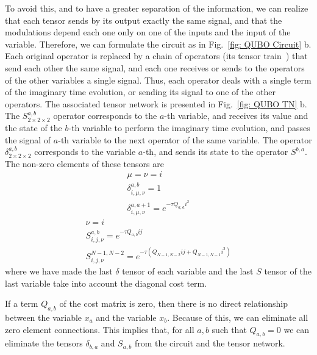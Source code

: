 To avoid this, and to have a greater separation of the information, we can realize that each tensor sends by its output exactly the same signal, and that the modulations depend each one only on one of the inputs and the input of the variable. Therefore, we can formulate the circuit as in Fig.~\ref{fig: QUBO Circuit} b. Each original operator is replaced by a chain of operators (its tensor train~\cite{Tensor_Train}) that send each other the same signal, and each one receives or sends to the operators of the other variables a single signal. Thus, each operator deals with a single term of the imaginary time evolution, or sending its signal to one of the other operators. The associated tensor network is presented in Fig.~\ref{fig: QUBO TN} b. The $S^{a,b}_{2\times 2\times 2}$ operator corresponds to the $a$-th variable, and receives its value and the state of the $b$-th variable to perform the imaginary time evolution, and passes the signal of $a$-th variable to the next operator of the same variable. The operator $\delta^{a,b}_{2\times 2\times 2}$ corresponds to the variable $a$-th, and sends its state to the operator $S^{b,a}$. The non-zero elements of these tensors are 
\begin{equation}\label{eq: QUBO delta}
    \begin{gathered}
        \mu = \nu = i\\
        \delta^{a,b}_{i,\mu,\nu} = 1\\
        \delta^{a,a+1}_{i,\mu,\nu} = e^{-\tau Q_{a,a}i^2}
    \end{gathered}
\end{equation}
\begin{equation}\label{eq: QUBO S}
    \begin{gathered}
        \nu = i\\
        S^{a,b}_{i,j,\nu} = e^{-\tau Q_{a,b}ij}\\
        S^{N-1,N-2}_{i,j,\nu} = e^{-\tau (Q_{N-1,N-2}ij+Q_{N-1,N-1}i^2)}
    \end{gathered}
\end{equation}
where we have made the last $\delta$ tensor of each variable and the last $S$ tensor of the last variable take into account the diagonal cost term.

If a term $Q_{a,b}$ of the cost matrix is zero, then there is no direct relationship between the variable $x_a$ and the variable $x_b$. Because of this, we can eliminate all zero element connections. This implies that, for all $a,b$ such that $Q_{a,b}=0$ we can eliminate the tensors $\delta_{b,a}$ and $S_{a,b}$ from the circuit and the tensor network.

